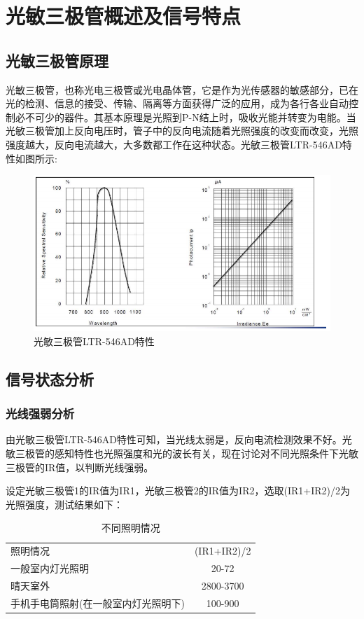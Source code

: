 \section{光敏三极管概述及信号特点}

\subsection{光敏三极管原理}
\par{光敏三极管，也称光电三极管或光电晶体管，它是作为光传感器的敏感部分，已在光的检测、信息的接受、传输、隔离等方面获得广泛的应用，成为各行各业自动控制必不可少的器件。其基本原理是光照到P-N结上时，吸收光能并转变为电能。当光敏三极管加上反向电压时，管子中的反向电流随着光照强度的改变而改变，光照强度越大，反向电流越大，大多数都工作在这种状态。光敏三极管LTR-546AD特性如图所示:}

\begin{figure}[H]
\centering
\includegraphics[width=12cm]{figure/1.1.1.png}
\caption{光敏三极管LTR-546AD特性} \label{fig:1.1.1}
\end{figure}

\subsection{信号状态分析}

\subsubsection{光线强弱分析}
\par{由光敏三极管LTR-546AD特性可知，当光线太弱是，反向电流检测效果不好。光敏三极管的感知特性也光照强度和光的波长有关，现在讨论对不同光照条件下光敏三极管的IR值，以判断光线强弱。}
\par{设定光敏三极管1的IR值为IR1，光敏三极管2的IR值为IR2，选取(IR1+IR2)/2为光照强度，测试结果如下：}

\begin{table}[h]
	\centering
	\begin{tabular}{|l|c|}
        照明情况&(IR1+IR2)/2\\
        一般室内灯光照明&20-72\\
        晴天室外&2800-3700\\
        手机手电筒照射(在一般室内灯光照明下)&100-900\\
	\end{tabular}
	\caption{不同照明情况}
	\label{tab:1.1}
\end{table}

